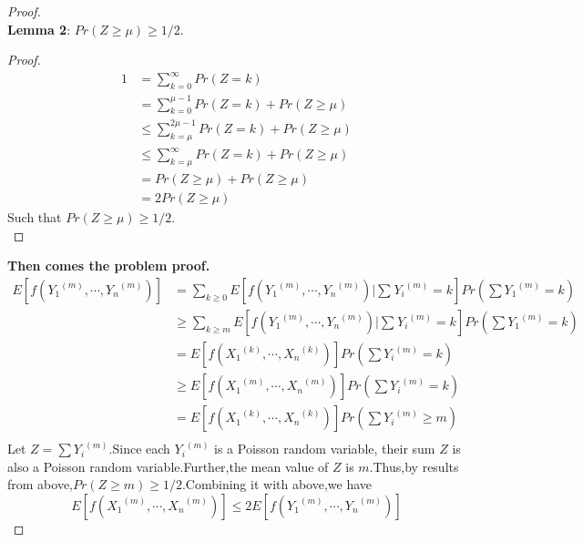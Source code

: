 \begin{proof}
	\textbf{\\Lemma 2}: $Pr(Z\geq\mu)\geq 1/2$.\\
	\begin{proof}
		\begin{equation*}
		\begin{split}
			1 &= \sum_{k=0}^{\infty}Pr(Z=k)\\
			&= \sum_{k=0}^{\mu-1}Pr(Z=k)+Pr(Z \geq \mu)\\
			&\leq \sum_{k=\mu}^{2\mu-1}Pr(Z=k)+Pr(Z \geq \mu)\\
			&\leq \sum_{k=\mu}^{\infty}Pr(Z=k)+Pr(Z \geq \mu)\\
			&= Pr(Z \geq \mu)+Pr(Z \geq \mu)\\
			&= 2Pr(Z \geq \mu)
		\end{split}
	\end{equation*}
	Such that $Pr(Z \geq \mu) \geq 1/2$.\\
	\end{proof}
	\textbf{Then comes the problem proof.}
	\begin{equation*}
		\begin{split}
			E \left[f({Y_1}^{(m)},\cdots,{Y_n}^{(m)}) \right]
			&= \sum_{k \geq 0}^{}E \left[f({Y_1}^{(m)},\cdots,{Y_n}^{(m)})|\sum_{}^{}{Y_i}^{(m)}=k \right]Pr \left(\sum{Y_1}^{(m)}=k \right)\\
			&\geq \sum_{k\geq m}^{}E \left[f({Y_1}^{(m)},\cdots,{Y_n}^{(m)})|\sum_{}^{}{Y_i}^{(m)}=k \right]Pr \left(\sum{Y_1}^{(m)}=k \right)\\
			&= E \left[f({X_1}^{(k)},\cdots,{X_n}^{(k)}) \right]Pr \left(\sum{Y_i}^{(m)}=k \right)\\
			&\geq E \left[f({X_1}^{(m)},\cdots,{X_n}^{(m)}) \right]Pr \left(\sum{Y_i}^{(m)}=k \right)\\
			&= E \left[f({X_1}^{(k)},\cdots,{X_n}^{(k)}) \right]Pr \left(\sum{Y_i}^{(m)} \geq m \right)\\
		\end{split}
	\end{equation*}
	Let $Z=\sum{Y_i}^{(m)}$.Since each ${Y_i}^{(m)}$ is a Poisson random variable, their sum $Z$ is also a Poisson random variable.Further,the mean value of $Z$ is $m$.Thus,by results from above,$Pr(Z \geq m)\geq 1/2$.Combining it with above,we have
	\begin{equation*}
		E \left[f({X_1}^{(m)},\cdots,{X_n}^{(m)}) \right]\leq 2E \left[f({Y_1}^{(m)},\cdots,{Y_n}^{(m)}) \right]
	\end{equation*}
	\end{proof}
	
